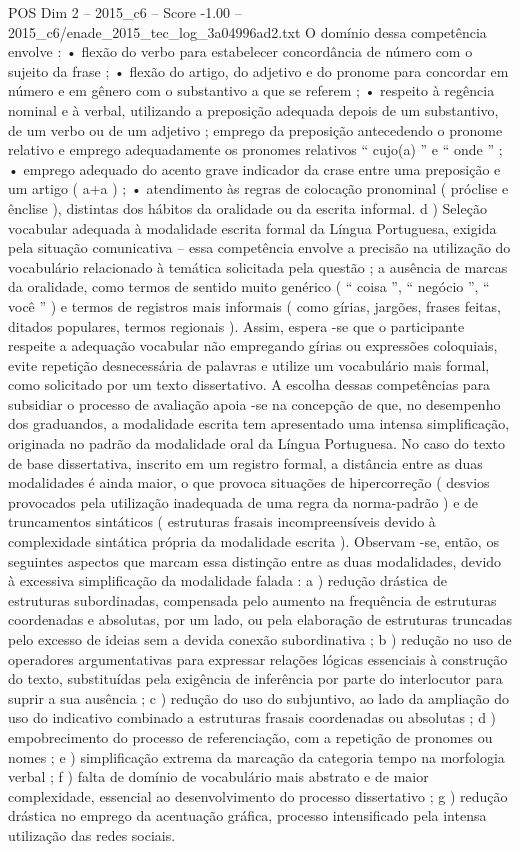 \begin{textsample}{POS Dim 2 – 2015\_c6 – Score -1.00 – 2015\_c6/enade\_2015\_tec\_log\_3a04996ad2.txt}
O domínio dessa competência envolve : • flexão do verbo para estabelecer concordância de número com o sujeito da frase ; • flexão do artigo, do adjetivo e do pronome para concordar em número e em gênero com o substantivo a que se referem ; • respeito à regência nominal e à verbal, utilizando a preposição adequada depois de um substantivo, de um verbo ou de um adjetivo ; emprego da preposição antecedendo o pronome relativo e emprego adequadamente os pronomes relativos “ cujo(a) ” e “ onde ” ; • emprego adequado do acento grave indicador da crase entre uma preposição e um artigo ( a+a ) ; • atendimento às regras de colocação pronominal ( próclise e ênclise ), distintas dos hábitos da oralidade ou da escrita informal. d ) Seleção vocabular adequada à modalidade escrita formal da Língua Portuguesa, exigida pela situação comunicativa – essa competência envolve a precisão na utilização do vocabulário relacionado à temática solicitada pela questão ; a ausência de marcas da oralidade, como termos de sentido muito genérico ( “ coisa ”, “ negócio ”, “ você ” ) e termos de registros mais informais ( como gírias, jargões, frases feitas, ditados populares, termos regionais ).
Assim, espera -se que o participante respeite a adequação vocabular não empregando gírias ou expressões coloquiais, evite repetição desnecessária de palavras e utilize um vocabulário mais formal, como solicitado por um texto dissertativo.
A escolha dessas competências para subsidiar o processo de avaliação apoia -se na concepção de que, no desempenho dos graduandos, a modalidade escrita tem apresentado uma intensa simplificação, originada no padrão da modalidade oral da Língua Portuguesa.
No caso do texto de base dissertativa, inscrito em um registro formal, a distância entre as duas modalidades é ainda maior, o que provoca situações de hipercorreção ( desvios provocados pela utilização inadequada de uma regra da norma-padrão ) e de truncamentos sintáticos ( estruturas frasais incompreensíveis devido à complexidade sintática própria da modalidade escrita ).
Observam -se, então, os seguintes aspectos que marcam essa distinção entre as duas modalidades, devido à excessiva simplificação da modalidade falada : a ) redução drástica de estruturas subordinadas, compensada pelo aumento na frequência de estruturas coordenadas e absolutas, por um lado, ou pela elaboração de estruturas truncadas pelo excesso de ideias sem a devida conexão subordinativa ; b ) redução no uso de operadores argumentativas para expressar relações lógicas essenciais à construção do texto, substituídas pela exigência de inferência por parte do interlocutor para suprir a sua ausência ; c ) redução do uso do subjuntivo, ao lado da ampliação do uso do indicativo combinado a estruturas frasais coordenadas ou absolutas ; d ) empobrecimento do processo de referenciação, com a repetição de pronomes ou nomes ; e ) simplificação extrema da marcação da categoria tempo na morfologia verbal ; f ) falta de domínio de vocabulário mais abstrato e de maior complexidade, essencial ao desenvolvimento do processo dissertativo ; g ) redução drástica no emprego da acentuação gráfica, processo intensificado pela intensa utilização das redes sociais.

\end{textsample}
